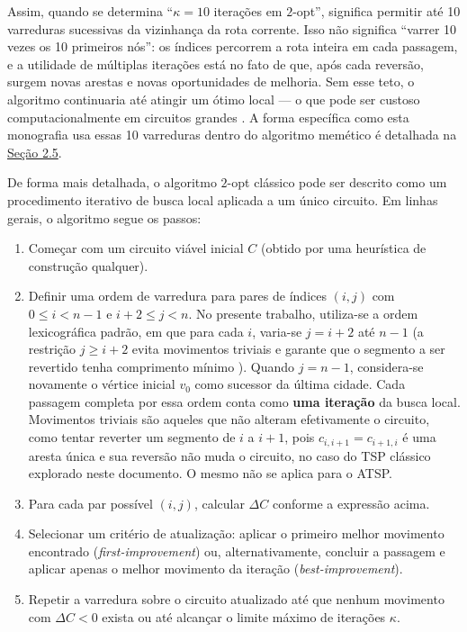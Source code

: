 Assim, quando se determina ``\(\kappa = 10\) iterações em \(2\)-opt'',
significa permitir até 10 varreduras sucessivas da vizinhança da rota
corrente. Isso não significa ``varrer 10 vezes os 10 primeiros nós'': os
índices percorrem a rota inteira em cada passagem, e a utilidade de
múltiplas iterações está no fato de que, após cada reversão, surgem
novas arestas e novas oportunidades de melhoria. Sem esse teto, o
algoritmo continuaria até atingir um ótimo local --- o que pode ser
custoso computacionalmente em circuitos grandes
\autocite{lin1973efficient}. A forma específica como esta monografia usa
essas 10 varreduras dentro do algoritmo memético é detalhada na
\hyperref[sec-25-algoritmos-memeticos]{Seção 2.5}.

De forma mais detalhada, o algoritmo \(2\)-opt clássico pode ser
descrito como um procedimento iterativo de busca local aplicada a um
único circuito. Em linhas gerais, o algoritmo segue os passos:

\begin{enumerate}
  \def\labelenumi{\arabic{enumi}.}
  \tightlist
  \item
        Começar com um circuito viável inicial \(C\) (obtido por uma
        heurística de construção qualquer).
  \item
        Definir uma ordem de varredura para pares de índices \((i,j)\) com
        \(0 \leq i < n-1\) e \(i+2 \leq j < n\). No presente trabalho,
        utiliza-se a ordem lexicográfica padrão, em que para cada \(i\),
        varia-se \(j = i+2\) até \(n-1\) (a restrição \(j \geq i+2\) evita
        movimentos triviais e garante que o segmento a ser
        revertido tenha comprimento mínimo \autocite{croes1958method}). Quando
        \(j = n-1\), considera-se novamente o vértice inicial \(v_0\) como
        sucessor da última cidade. Cada passagem completa por essa ordem conta
        como \textbf{uma iteração} da busca local. Movimentos triviais são
        aqueles que não alteram efetivamente o circuito, como tentar reverter
        um segmento de \(i\) a \(i+1\), pois \(c_{i, i+1}=c_{i+1, i}\) é
        uma aresta única e sua reversão não muda o circuito, no caso do TSP
        clássico explorado neste documento. O mesmo não se aplica para o ATSP.
  \item
        Para cada par possível \((i,j)\), calcular \(\Delta C\) conforme a
        expressão acima.
  \item
        Selecionar um critério de atualização: aplicar o primeiro melhor
        movimento encontrado (\emph{first-improvement}) ou, alternativamente,
        concluir a passagem e aplicar apenas o melhor movimento da iteração
        (\emph{best-improvement}).
  \item
        Repetir a varredura sobre o circuito atualizado até que nenhum
        movimento com \(\Delta C < 0\) exista ou até alcançar o limite máximo
        de iterações \(\kappa\).
\end{enumerate}

